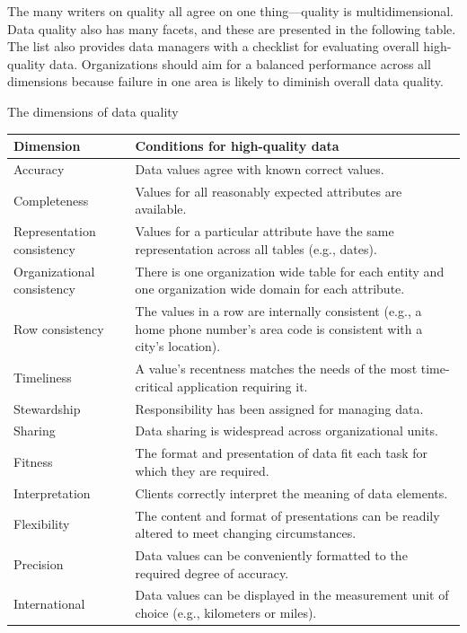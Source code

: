 \documentclass[
]{article}
\begin{document}
The many writers on quality all agree on one thing---quality is
multidimensional. Data quality also has many facets, and these are
presented in the following table. The list also provides data managers
with a checklist for evaluating overall high-quality data. Organizations
should aim for a balanced performance across all dimensions because
failure in one area is likely to diminish overall data quality.

The dimensions of data quality

\begin{longtable}[]{@{}
  >{\raggedright\arraybackslash}p{}
  >{\raggedright\arraybackslash}p{}@{}}
\toprule
Dimension & Conditions for high-quality data \\
\midrule
\endhead
Accuracy & Data values agree with known correct values. \\
Completeness & Values for all reasonably expected attributes are available. \\
Representation consistency & Values for a particular attribute have the same representation across all tables (e.g., dates). \\
Organizational consistency & There is one organization wide table for each entity and one organization wide domain for each attribute. \\
Row consistency & The values in a row are internally consistent (e.g., a home phone number's area code is consistent with a city's location). \\
Timeliness & A value's recentness matches the needs of the most time-critical application requiring it. \\
Stewardship & Responsibility has been assigned for managing data. \\
Sharing & Data sharing is widespread across organizational units. \\
Fitness & The format and presentation of data fit each task for which they are required. \\
Interpretation & Clients correctly interpret the meaning of data elements. \\
Flexibility & The content and format of presentations can be readily altered to meet changing circumstances. \\
Precision & Data values can be conveniently formatted to the required degree of accuracy. \\
International & Data values can be displayed in the measurement unit of choice (e.g., kilometers or miles). \\

\end{longtable}
\end{document}
